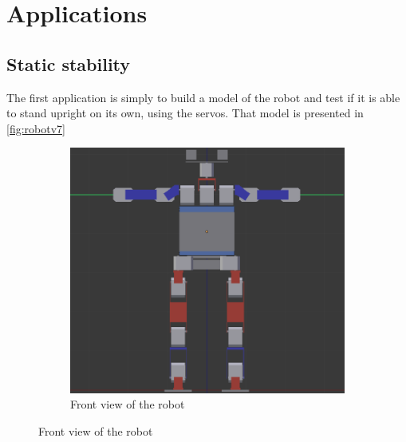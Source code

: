 \section{Applications}
\subsection{Static stability}
The first application is simply to build a model of the robot and test if it is able to stand upright on its own, using the servos. That model is presented in \cref{fig:robotv7}

\begin{figure}[htp]
\center
\begin{subfigure}[b]{0.8\textwidth}
    \includegraphics[width = \textwidth]{figures/robot_v7_front}
    \caption[]{Front view of the robot}
    \label{fig:robotv7_front}
\end{subfigure}


\end{figure}
